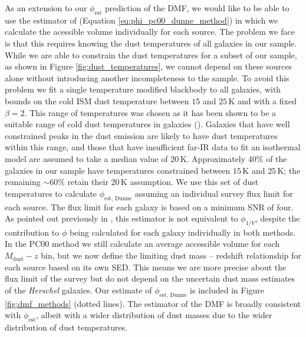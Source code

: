 As an extension to our $\phi_{\textrm{est}}$ prediction of the DMF, we would like to be able to use the estimator of \citealt{Dunne_2011} (Equation \ref{eq:phi_pc00_dunne_method}) in which we calculate the acessible volume individually for each source. The problem we face is that this requires knowing the dust temperatures of all galaxies in our sample. While we are able to constrain the dust temperatures for a subset of our sample, as shown in Figure \ref{fig:dust_temperatures}, we cannot depend on these sources alone without introducing another incompleteness to the sample. To avoid this problem we fit a single temperature modified blackbody to all galaxies, with bounds on the cold ISM dust temperature between $15$ and $25\,$K and with a fixed $\beta = 2$. This range of temperatures was chosen as it has been shown to be a suitable range of cold dust temperatures in galaxies (\citealt{Dunne_2001, daCunha_2008, Smith_2012b, Clark_2015, Beeston_2018}). Galaxies that have well constrained peaks in the dust emission are likely to have dust temperatures within this range, and those that have insufficient far-IR data to fit an isothermal model are assumed to take a median value of $20\,$K. Approximately $40\%$ of the galaxies in our sample have temperatures constrained between $15\,$K and $25\,$K; the remaining $\sim 60\%$ retain their $20\,$K assumption. We use this set of dust temperatures to calculate $\phi_{\textrm{est, Dunne}}$ assuming an individual survey flux limit for each source. The flux limit for each galaxy is based on a minimum SNR of four. As pointed out previously in \citealt{Dunne_2011}, this estimator is not equivalent to $\phi_{1/V}$, despite the contribution to $\phi$ being calculated for each galaxy individually in both methods. In the PC00 method we still calculate an average accessible volume for each $M_{\textrm{dust}} - z$ bin, but we now define the limiting dust mass -- redshift relationship for each source based on its own SED. This means we are more precise about the flux limit of the survey but do not depend on the uncertain dust mass estimates of the \textit{Herschel} galaxies. Our estimate of $\phi_{\textrm{est, Dunne}}$ is included in Figure \ref{fig:dmf_methods} (dotted lines). The \citealt{Dunne_2011} estimator of the DMF is broadly consistent with $\phi_{\textrm{est}}$, albeit with a wider distribution of dust masses due to the wider distribution of dust temperatures.

